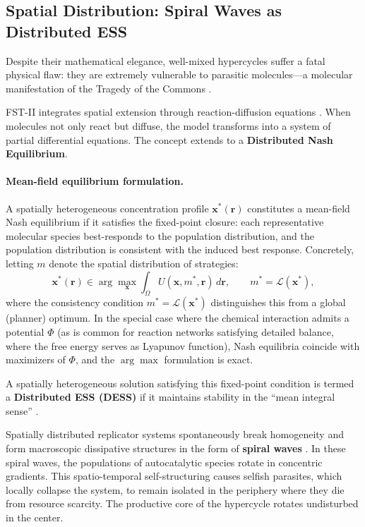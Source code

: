 \documentclass[12pt,a4paper]{article}
\theoremstyle{remark}
\begin{document}
\subsection{Spatial Distribution: Spiral Waves as Distributed ESS}

Despite their mathematical elegance, well-mixed hypercycles suffer a fatal physical flaw: they are extremely vulnerable to parasitic molecules---a molecular manifestation of the Tragedy of the Commons \citep{HypercycleInfinite}.

FST-II integrates spatial extension through reaction-diffusion equations \citep{ReplicatorDiffusion}. When molecules not only react but diffuse, the model transforms into a system of partial differential equations. The concept extends to a \textbf{Distributed Nash Equilibrium}.

\paragraph{Mean-field equilibrium formulation.}
A spatially heterogeneous concentration profile $\mathbf{x}^*(\mathbf{r})$ constitutes a mean-field Nash equilibrium if it satisfies the fixed-point closure: each representative molecular species best-responds to the population distribution, and the population distribution is consistent with the induced best response. Concretely, letting $m$ denote the spatial distribution of strategies:
\begin{equation}
\mathbf{x}^*(\mathbf{r}) \in \arg\max_{\mathbf{x}} \int_\Omega U(\mathbf{x}, m^*, \mathbf{r}) \, d\mathbf{r}, \qquad m^* = \mathcal{L}(\mathbf{x}^*),
\end{equation}
where the consistency condition $m^* = \mathcal{L}(\mathbf{x}^*)$ distinguishes this from a global (planner) optimum. In the special case where the chemical interaction admits a potential $\Phi$ (as is common for reaction networks satisfying detailed balance, where the free energy serves as Lyapunov function), Nash equilibria coincide with maximizers of $\Phi$, and the $\arg\max$ formulation is exact.

A spatially heterogeneous solution satisfying this fixed-point condition is termed a \textbf{Distributed ESS (DESS)} if it maintains stability in the ``mean integral sense'' \citep{ReplicatorDiffusion}.

Spatially distributed replicator systems spontaneously break homogeneity and form macroscopic dissipative structures in the form of \textbf{spiral waves} \citep{SpiralWaves}. In these spiral waves, the populations of autocatalytic species rotate in concentric gradients. This spatio-temporal self-structuring causes selfish parasites, which locally collapse the system, to remain isolated in the periphery where they die from resource scarcity. The productive core of the hypercycle rotates undisturbed in the center.
\end{document}
